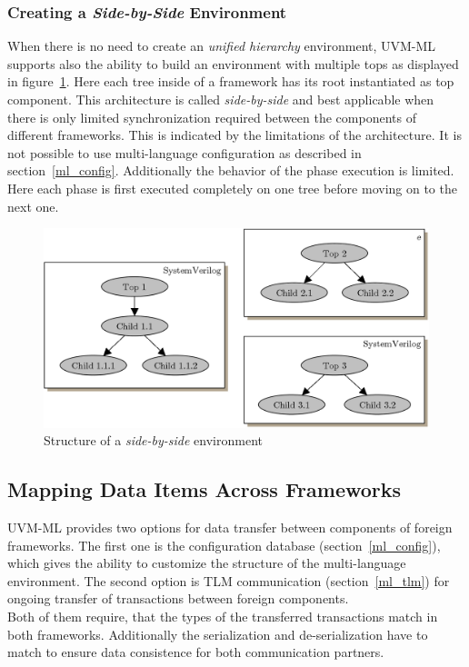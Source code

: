 \subsubsection{Creating a \emph{Side-by-Side} Environment}

When there is no need to create an \emph{unified hierarchy} environment, UVM-ML supports also the ability to build an
environment with multiple tops as displayed in figure~\ref{fig:UVM_ML_side_by_side}. Here each tree inside of a
framework has its root instantiated as top component. This architecture is called \emph{side-by-side} and best
applicable when there is only limited synchronization required between the components of different frameworks. This is
indicated by the limitations of the architecture. It is not possible to use multi-language configuration as described in
section~\ref{ml_config}. Additionally the behavior of the phase execution is limited. Here each phase is first executed
completely on one tree before moving on to the next one. 

\begin{figure}[htb]
 \centering
 \includegraphics[scale=0.3]{abb/UVM_ML_side_by_side}
 \caption{Structure of a \emph{side-by-side} environment}
\label{fig:UVM_ML_side_by_side}
\end{figure}

\subsection{Mapping Data Items Across Frameworks }\label{type_mapping}
UVM-ML provides two options for data transfer between components of foreign frameworks. The first one is the configuration
database (section~\ref{ml_config}), which gives the ability to customize the structure of the multi-language
environment. The second option is TLM communication (section~\ref{ml_tlm}) for ongoing transfer of transactions between foreign components.\\
Both of them require, that the types of the transferred transactions match in both frameworks. Additionally the
serialization and de-serialization have to match to ensure data consistence for both communication partners.

